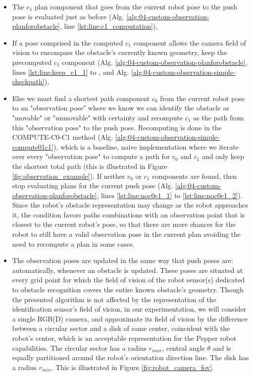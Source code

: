 \begin{itemize}
  \item The $c_{1}$ plan component that goes from the current robot pose to the push pose is evaluated just as before (Alg. \ref{alg:04-custom-observation-planforobstacle}, line \ref{lst:line:c1_computation}),
  \item If a pose comprised in the computed $c_{1}$ component allows the camera field of vision to encompass the obstacle's currently known geometry, keep the precomputed $c_{1}$ component (Alg. \ref{alg:04-custom-observation-planforobstacle}, lines \ref{lst:line:keep_c1_1} to \label{lst:line:keep_c1_2}, and Alg. \ref{alg:04-custom-observation-simple-checkpath}),
  \item Else we must find a shortest path component $c_{0}$ from the current robot pose to an "observation pose" where we know we can identify the obstacle as "movable" or "unmovable" with certainty and recompute $c_{1}$ as the path from this "observation pose" to the push pose. Recomputing is done in the COMPUTE-C0-C1 method (Alg. \ref{alg:04-custom-observation-simple-compute01c1}), which is a baseline, naive implementation where we iterate over every "observation pose" to compute a path for $c_{0}$ and $c_{1}$ and only keep the shortest total path (this is illustrated in Figure \ref{fig:observation_example}). If neither $c_{0}$ or $c_{1}$ components are found, then stop evaluating plans for the current push pose (Alg. \ref{alg:04-custom-observation-planforobstacle}, lines \ref{lst:line:noc0c1_1} to \ref{lst:line:noc0c1_2}). Since the robot's obstacle representation may change as the robot approaches it, the condition favors paths combinations with an observation point that is closest to the current robot's pose, so that there are more chances for the robot to still have a valid observation pose in the current plan avoiding the need to recompute a plan in some cases.
  \item The observation poses are updated in the same way that push poses are: automatically, whenever an obstacle is updated. These poses are situated at every grid point for which the field of vision of the robot sensor(s) dedicated to obstacle recognition covers the entire known obstacle's geometry. Though the presented algorithm is not affected by the representation of the identification sensor's field of vision, in our experimentation, we will consider a single RGB(D) camera, and approximate its field of vision by the difference between a circular sector and a disk of same center, coincident with the robot's center, which is an acceptable representation for the Pepper robot capabilities. The circular sector has a radius $r_{max}$, central angle $\theta$ and is equally partitioned around the robot's orientation direction line. The disk has a radius $r_{min}$. This is illustrated in Figure \ref{fig:robot_camera_fov}.
\end{itemize}

